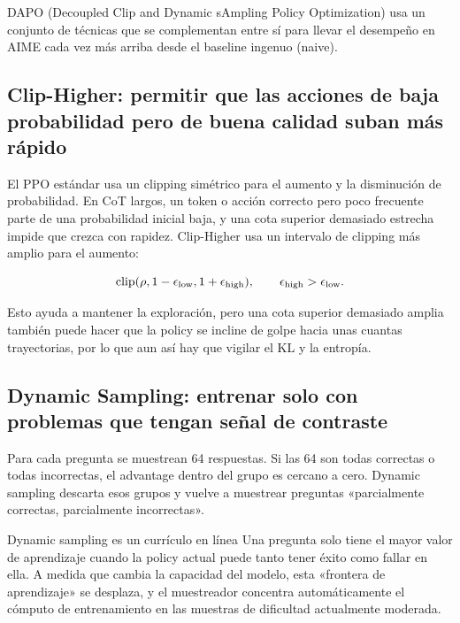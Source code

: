 \documentclass[a4paper]{article}
\begin{document}
DAPO (Decoupled Clip and Dynamic sAmpling Policy Optimization) usa un conjunto de técnicas que se complementan entre sí para llevar el desempeño en AIME cada vez más arriba desde el baseline ingenuo (naive).

\subsection{Clip-Higher: permitir que las acciones de baja probabilidad pero de buena calidad suban más rápido}

El PPO estándar usa un clipping simétrico para el aumento y la disminución de probabilidad. En CoT largos, un token o acción correcto pero poco frecuente parte de una probabilidad inicial baja, y una cota superior demasiado estrecha impide que crezca con rapidez. Clip-Higher usa un intervalo de clipping más amplio para el aumento:

$$
\operatorname{clip}(\rho,1-\epsilon_{\rm low},1+\epsilon_{\rm high}),
\qquad \epsilon_{\rm high}>\epsilon_{\rm low}.
$$


Esto ayuda a mantener la exploración, pero una cota superior demasiado amplia también puede hacer que la policy se incline de golpe hacia unas cuantas trayectorias, por lo que aun así hay que vigilar el KL y la entropía.

\subsection{Dynamic Sampling: entrenar solo con problemas que tengan señal de contraste}

Para cada pregunta se muestrean 64 respuestas. Si las 64 son todas correctas o todas incorrectas, el advantage dentro del grupo es cercano a cero. Dynamic sampling descarta esos grupos y vuelve a muestrear preguntas «parcialmente correctas, parcialmente incorrectas».


\begin{knowledgebox}{Dynamic sampling es un currículo en línea}
Una pregunta solo tiene el mayor valor de aprendizaje cuando la policy actual puede tanto tener éxito como fallar en ella. A medida que cambia la capacidad del modelo, esta «frontera de aprendizaje» se desplaza, y el muestreador concentra automáticamente el cómputo de entrenamiento en las muestras de dificultad actualmente moderada.
\end{knowledgebox}
\end{document}
